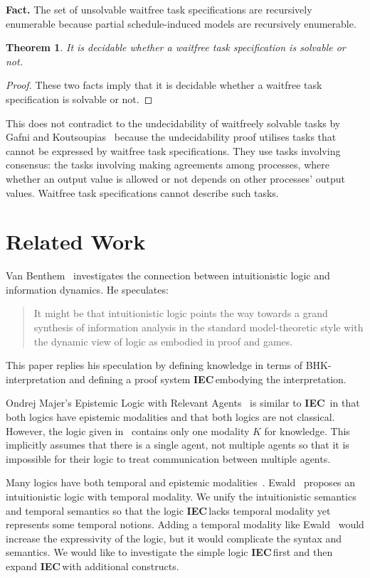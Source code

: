 \documentclass[doctor]{iscs-thesis}
\newcommand{\iec}{{\rm {\textbf{IEC}}}}
\newtheorem{theorem}{Theorem}
\begin{document}
\noindent \textbf{Fact.} The set of unsolvable waitfree task
specifications are recursively enumerable because partial schedule-induced
models are recursively enumerable.

\begin{theorem}
 \label{wf-dec}
 It is decidable whether a waitfree task
specification is solvable or not.
\end{theorem}
\begin{proof}
These two facts imply that it is decidable whether a waitfree task
specification is solvable or not.
\end{proof}

This does not contradict to the undecidability
 of waitfreely solvable tasks by Gafni and
 Koutsoupias~\cite{gafni1999three}
 because the undecidability proof
utilises tasks that cannot be expressed by waitfree task specifications.
They use tasks involving consensus:
the tasks involving making agreements among processes, where
whether an output value is allowed or not depends on other processes'
output values.  Waitfree task specifications cannot describe such tasks.

\section{Related Work}
\label{first:related}

Van Benthem~\cite{van2009information} investigates the connection between
intuitionistic logic and information dynamics.  He speculates:
\begin{quotation}
It might be
that intuitionistic logic points the way towards a grand synthesis of information analysis
in the standard model-theoretic style with the dynamic view of logic as embodied
in proof and games.
\end{quotation}
This paper replies his speculation by defining knowledge in terms of BHK-interpretation
and defining a proof system \iec\,embodying the interpretation.

Ondrej Majer's 
Epistemic Logic with Relevant Agents~\cite{majer-epistemic}
is similar to \iec\, in that both logics have epistemic modalities and that both logics are
not classical.
However, the logic given in~\cite{majer-epistemic}
 contains only one modality $K$ for knowledge.
This implicitly assumes that there is a single agent, not multiple agents so that it is
impossible for their logic to treat communication between multiple agents.

Many logics have both temporal and epistemic modalities~\cite{sato13study, wozna2005logic}.
Ewald~\cite{1986} proposes an intuitionistic logic with temporal modality.
We unify the intuitionistic semantics and temporal semantics so that the logic
\iec\,lacks temporal modality yet represents some temporal notions.
Adding a temporal modality like Ewald~\cite{1986} would increase the expressivity of the
logic, but it would complicate the syntax and semantics.
We would like to investigate the simple logic \iec\,first
 and then expand \iec\,with
additional constructs.
\end{document}
